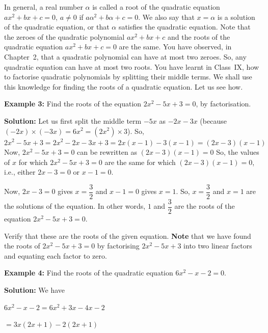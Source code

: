 \documentclass[11pt]{article}
\begin{document}
In general, a real number $\alpha$ is called a root of the quadratic equation
$ax^2 + bx + c = 0$, $a \neq 0$ if $a\alpha^2 + b\alpha + c = 0$.
We also say that $x = \alpha$ is a solution of the quadratic equation, or that
$\alpha$ satisfies the quadratic equation.
Note that the zeroes of the quadratic polynomial $ax^2 + bx + c$ and the roots
of the quadratic equation $ax^2 + bx + c = 0$ are the same.
You have observed, in Chapter~2, that a quadratic polynomial can have at most two zeroes. So, any quadratic equation can have at most two roots. You have learnt in Class~IX, how to factorise quadratic polynomials by splitting
their middle terms. We shall use this knowledge for finding the roots of a quadratic equation. Let us see how.

\medskip
\noindent\textcolor{chapterblue}{\textbf{Example 3:}}
Find the roots of the equation $2x^2 - 5x + 3 = 0$, by factorisation.

\medskip
\noindent\textcolor{chapterblue}{\textbf{Solution:}}
Let us first split the middle term $-5x$ as $-2x - 3x$
(because $(-2x) \times (-3x) = 6x^2 = (2x^2) \times 3$).
So,
$2x^2 - 5x + 3= 2x^2 - 2x - 3x + 3
= 2x(x - 1) - 3(x - 1)
= (2x - 3)(x - 1)$
Now, $2x^2 - 5x + 3 = 0$ can be rewritten as
$(2x - 3)(x - 1) = 0$
So, the values of $x$ for which $2x^2 - 5x + 3 = 0$ are the same for which
$(2x - 3)(x - 1) = 0$, i.e., either $2x - 3 = 0$ or $x - 1 = 0$.

Now, $2x - 3 = 0$ gives $x = \dfrac{3}{2}$ and $x - 1 = 0$ gives $x = 1$.
So, $x = \dfrac{3}{2}$ and $x = 1$ are the solutions of the equation.
In other words, $1$ and $\dfrac{3}{2}$ are the roots of the equation
$2x^2 - 5x + 3 = 0$.

\medskip
Verify that these are the roots of the given equation.
\noindent
\textbf{Note} that we have found the roots of $2x^2 - 5x + 3 = 0$ by factorising
$2x^2 - 5x + 3$ into two linear factors and equating each factor to zero.

\medskip
\noindent\textcolor{chapterblue}{\textbf{Example 4:}}
Find the roots of the quadratic equation $6x^2 - x - 2 = 0$.

\medskip
\noindent\textcolor{chapterblue}{\textbf{Solution:}}
We have

\begin{center}
$6x^2 - x - 2 = 6x^2 + 3x - 4x - 2$
\end{center}

\begin{center}
$= 3x(2x + 1) - 2(2x + 1)$
\end{center}
\end{document}

